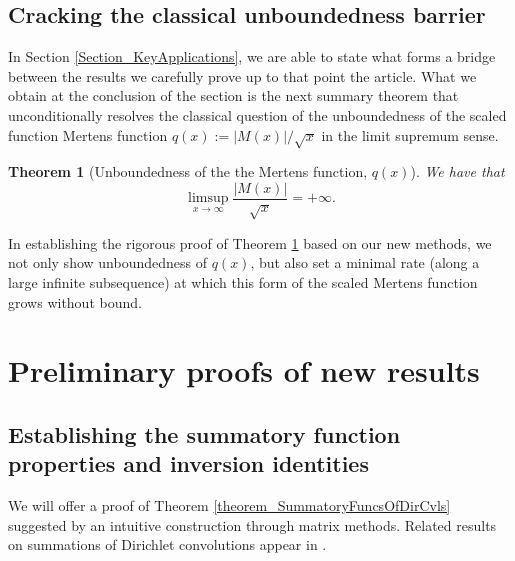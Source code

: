 \documentclass[11pt,reqno,a4letter]{article}
\numberwithin{figure}{section}
\numberwithin{table}{section}
\newcommand{\cf}{\textit{cf.\ }}
\theoremstyle{plain}
\newtheorem{theorem}{Theorem}
\numberwithin{theorem}{section}
\theoremstyle{definition}
\begin{document}
\subsection{Cracking the classical unboundedness barrier} 

In Section \ref{Section_KeyApplications}, 
we are able to state what forms a bridge between the results 
we carefully prove up to that point the article. 
What we obtain at the conclusion of the section 
is the next summary theorem that unconditionally 
resolves the classical question of the 
unboundedness of the scaled function Mertens function 
$q(x) := |M(x)| / \sqrt{x}$ in the limit supremum sense. 

\begin{theorem}[Unboundedness of the the Mertens function, $q(x)$] 
\label{cor_ThePipeDreamResult_v1} 
We have that 
\[
\limsup_{x \rightarrow \infty} \frac{|M(x)|}{\sqrt{x}} = +\infty. 
\]
\end{theorem} 

In establishing the rigorous proof of 
Theorem \ref{cor_ThePipeDreamResult_v1} 
based on our new methods, we not only show unboundedness of 
$q(x)$, but also set a minimal rate (along a large infinite subsequence) 
at which this form of the 
scaled Mertens function grows without bound. 

\newpage 
\section{Preliminary proofs of new results} 
\label{Section_PrelimProofs_Config} 

\subsection{Establishing the summatory function properties and inversion identities} 

We will offer a proof of Theorem \ref{theorem_SummatoryFuncsOfDirCvls} 
suggested by an intuitive construction through matrix methods. 
Related results on summations of Dirichlet convolutions appear in 
\cite[\S 2.14; \S 3.10; \S 3.12; \cf \S 4.9, p.\ 95]{APOSTOLANUMT}. 
\end{document}
